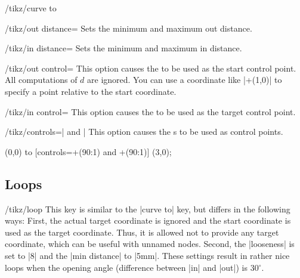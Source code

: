 \begin{key}{/tikz/curve to}
    \begin{key}{/tikz/out distance=}
        Sets the minimum and maximum out distance.
    \end{key}
    \begin{key}{/tikz/in distance=}
        Sets the minimum and maximum in distance.
    \end{key}
    \begin{key}{/tikz/out control=}
        This option causes the  to be used as the start
        control point. All computations of $d$ are ignored. You can use a
        coordinate like |+(1,0)| to specify a point relative to the start
        coordinate.
    \end{key}
    \begin{key}{/tikz/in control=}
        This option causes the  to be used as the target
        control point.
    \end{key}
    \begin{key}{/tikz/controls=| and |}
        This option causes the s to be used as control points.
\begin{codeexample}[]
\tikz \draw (0,0) to [controls=+(90:1) and +(90:1)] (3,0);
\end{codeexample}
    \end{key}
\end{key}


\subsection{Loops}

\begin{key}{/tikz/loop}
    This key is similar to the |curve to| key, but differs in the following
    ways: First, the actual target coordinate is ignored and the start
    coordinate is used as the target coordinate. Thus, it is allowed not to
    provide any target coordinate, which can be useful with unnamed nodes.
    Second, the |looseness| is set to |8| and the |min distance| to |5mm|.
    These settings result in rather nice loops when the opening angle
    (difference between |in| and |out|) is 30$^\circ$.
\begin{codeexample}[]
\end{codeexample}
\end{key}

